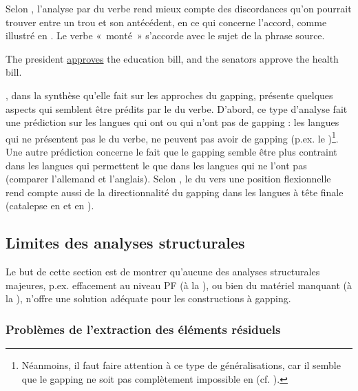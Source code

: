 Selon \citet{ZoernerEtAl2000}, l'analyse par  du verbe rend mieux compte des discordances qu’on pourrait trouver entre un trou et son antécédent, en ce qui concerne l’accord, comme illustré en . Le verbe «~monté~» s’accorde avec le sujet de la phrase source.  

\ea \label{ch2:ex214}
The president \uline{approves} the education bill, and the senators approve the health bill.
\z

\citet{Repp2009}, dans la synthèse qu’elle fait sur les approches du gapping, présente quelques aspects qui semblent être prédits par le  du verbe. D’abord, ce type d’analyse fait une prédiction sur les langues qui ont ou qui n’ont pas de gapping : les langues qui ne présentent pas le  du verbe, ne peuvent pas avoir de gapping (p.ex. le )\footnote{
 Néanmoins, il faut faire attention à ce type de généralisations, car il semble que le gapping ne soit pas complètement impossible en  (cf. \citealt{Paul1999,RuixiRessy2008}).}. Une autre prédiction concerne le fait que le gapping semble être plus contraint dans les langues qui permettent le  que dans les langues qui ne l’ont pas (comparer l’allemand et l’anglais). Selon \citet{LopezEtAl2003}, le  du  vers une position flexionnelle rend compte aussi de la directionnalité du gapping dans les langues à tête finale (catalepse en  et en ).  


\subsection{Limites des analyses structurales} \label{ch2:sect2.4.3}

Le but de cette section est de montrer qu’aucune des analyses structurales majeures, p.ex. effacement au niveau PF (à la \citealt{Coppock2001}), ou bien  du matériel manquant (à la \citealt{Johnson1996/2004,Johnson2009}), n’offre une solution adéquate pour les constructions à gapping.


\subsubsection{Problèmes de l’extraction des éléments résiduels} \label{ch2:sect2.4.3.1}

